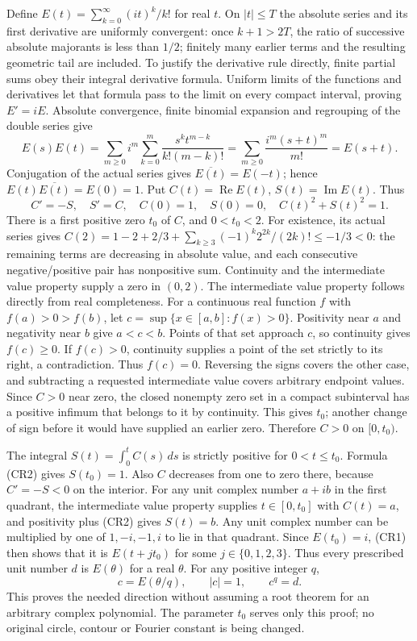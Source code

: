 \documentclass[
  11pt,
]{article}
\begin{document}
Define \(E(t)=\sum_{k=0}^{\infty}(it)^k/k!\) for real \(t\). On
\(|t|\leq T\) the absolute series and its first derivative are uniformly
convergent: once \(k+1>2T\), the ratio of successive absolute majorants
is less than \(1/2\); finitely many earlier terms and the resulting
geometric tail are included. To justify the derivative rule directly,
finite partial sums obey their integral derivative formula. Uniform
limits of the functions and derivatives let that formula pass to the
limit on every compact interval, proving \(E'=iE\). Absolute
convergence, finite binomial expansion and regrouping of the double
series give \[
 E(s)E(t)=\sum_{m\geq0}i^m
       \sum_{k=0}^m\frac{s^kt^{m-k}}{k!(m-k)!}
       =\sum_{m\geq0}\frac{i^m(s+t)^m}{m!}=E(s+t).              \tag{CR1}
\] Conjugation of the actual series gives \(\overline{E(t)}=E(-t)\);
hence \(E(t)\overline{E(t)}=E(0)=1\). Put
\(C(t)=\operatorname{Re}E(t)\), \(S(t)=\operatorname{Im}E(t)\). Thus \[
 C'=-S,\quad S'=C,\quad C(0)=1,\quad S(0)=0,\quad
                         C(t)^2+S(t)^2=1.                    \tag{CR2}
\] There is a first positive zero \(t_0\) of \(C\), and \(0<t_0<2\). For
existence, its actual series gives
\(C(2)=1-2+2/3+\sum_{k\geq3}(-1)^k2^{2k}/(2k)!\leq-1/3<0\): the
remaining terms are decreasing in absolute value, and each consecutive
negative/positive pair has nonpositive sum. Continuity and the
intermediate value property supply a zero in \((0,2)\). The intermediate
value property follows directly from real completeness. For a continuous
real function \(f\) with \(f(a)>0>f(b)\), let
\(c=\sup\{x\in[a,b]:f(x)>0\}\). Positivity near \(a\) and negativity
near \(b\) give \(a<c<b\). Points of that set approach \(c\), so
continuity gives \(f(c)\geq0\). If \(f(c)>0\), continuity supplies a
point of the set strictly to its right, a contradiction. Thus
\(f(c)=0\). Reversing the signs covers the other case, and subtracting a
requested intermediate value covers arbitrary endpoint values. Since
\(C>0\) near zero, the closed nonempty zero set in a compact subinterval
has a positive infimum that belongs to it by continuity. This gives
\(t_0\); another change of sign before it would have supplied an earlier
zero. Therefore \(C>0\) on \([0,t_0)\).

The integral \(S(t)=\int_0^t C(s)\,ds\) is strictly positive for
\(0<t\leq t_0\). Formula (CR2) gives \(S(t_0)=1\). Also \(C\) decreases
from one to zero there, because \(C'=-S<0\) on the interior. For any
unit complex number \(a+ib\) in the first quadrant, the intermediate
value property supplies \(t\in[0,t_0]\) with \(C(t)=a\), and positivity
plus (CR2) gives \(S(t)=b\). Any unit complex number can be multiplied
by one of \(1,-i,-1,i\) to lie in that quadrant. Since \(E(t_0)=i\),
(CR1) then shows that it is \(E(t+j t_0)\) for some \(j\in\{0,1,2,3\}\).
Thus every prescribed unit number \(d\) is \(E(\theta)\) for a real
\(\theta\). For any positive integer \(q\), \[
             c=E(\theta/q),\qquad |c|=1,\qquad c^q=d.           \tag{CR3}
\] This proves the needed direction without assuming a root theorem for
an arbitrary complex polynomial. The parameter \(t_0\) serves only this
proof; no original circle, contour or Fourier constant is being changed.
\end{document}

